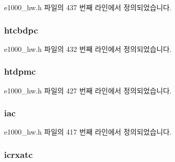 e1000\+\_\+hw.\+h 파일의 437 번째 라인에서 정의되었습니다.

\subsubsection[{\texorpdfstring{htcbdpc}{htcbdpc}}]{ htcbdpc}\hypertarget{structe1000__hw__stats_aca5f66e5be5af6fb2103113b7c296cf7}{}\label{structe1000__hw__stats_aca5f66e5be5af6fb2103113b7c296cf7}


e1000\+\_\+hw.\+h 파일의 432 번째 라인에서 정의되었습니다.

\subsubsection[{\texorpdfstring{htdpmc}{htdpmc}}]{ htdpmc}\hypertarget{structe1000__hw__stats_a1258d48790f68a0fedfc67f019ca95aa}{}\label{structe1000__hw__stats_a1258d48790f68a0fedfc67f019ca95aa}


e1000\+\_\+hw.\+h 파일의 427 번째 라인에서 정의되었습니다.

\subsubsection[{\texorpdfstring{iac}{iac}}]{ iac}\hypertarget{structe1000__hw__stats_a944343abcf124620cc6afd2527f24768}{}\label{structe1000__hw__stats_a944343abcf124620cc6afd2527f24768}


e1000\+\_\+hw.\+h 파일의 417 번째 라인에서 정의되었습니다.

\subsubsection[{\texorpdfstring{icrxatc}{icrxatc}}]{ icrxatc}\hypertarget{structe1000__hw__stats_aea84f80117cb2a7671d49ff0d0a959a4}{}\label{structe1000__hw__stats_aea84f80117cb2a7671d49ff0d0a959a4}


